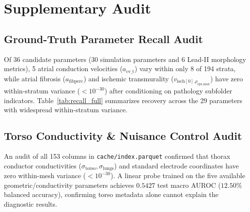 \documentclass[10pt,twocolumn,letterpaper]{article}
\begin{document}
\begingroup
\footnotesize
\let\oldthebibliography\thebibliography
\renewcommand{\thebibliography}[1]{%
  \oldthebibliography{#1}%
  \setlength{\itemsep}{0pt}%
  \setlength{\parskip}{0pt}%
  \setlength{\parsep}{0pt}%
}


\endgroup

\clearpage
\appendix
\section{Supplementary Audit}

\subsection{Ground-Truth Parameter Recall Audit}
Of 36 candidate parameters (30 simulation parameters and 6 Lead-II morphology metrics), 5 atrial conduction velocities ($a_{\text{cv\_t}}$) vary within only 8 of 194 strata, while atrial fibrosis ($a_{\text{fibperc}}$) and ischemic transmurality ($v_{\text{isch}[0].\rho_{\text{eps\_max}}}$) have zero within-stratum variance ($< 10^{-30}$) after conditioning on pathology subfolder indicators. Table~\ref{tab:recall_full} summarizes recovery across the 29 parameters with widespread within-stratum variance.

\begin{table}[h]
\centering
\caption{\textbf{Comprehensive Parameter Recall Audit ($|\rho| \ge 0.25, q < 0.05$).}}
\label{tab:recall_full}
\vspace{2pt}
\end{table}

\subsection{Torso Conductivity \& Nuisance Control Audit}
An audit of all 153 columns in \texttt{cache/index.parquet} confirmed that thorax conductor conductivities ($\sigma_{\text{torso}}, \sigma_{\text{lungs}}$) and standard electrode coordinates have zero within-mesh variance ($< 10^{-30}$). A linear probe trained on the five available geometric/conductivity parameters achieves $0.5427$ test macro AUROC ($12.50\%$ balanced accuracy), confirming torso metadata alone cannot explain the diagnostic results.
\end{document}

